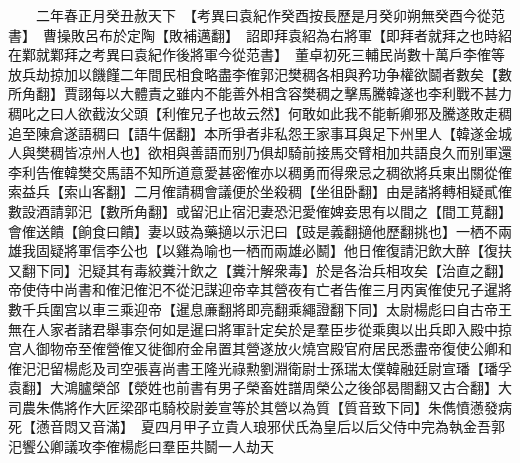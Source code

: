 　　二年春正月癸丑赦天下　【考異曰袁紀作癸酉按長歷是月癸卯朔無癸酉今從范書】　曹操敗呂布於定陶【敗補邁翻】　詔即拜袁紹為右將軍【即拜者就拜之也時紹在鄴就鄴拜之考異曰袁紀作後將軍今從范書】　董卓初死三輔民尚數十萬戶李傕等放兵劫掠加以饑饉二年間民相食略盡李傕郭汜樊稠各相與矜功争權欲鬬者數矣【數所角翻】賈詡每以大體責之雖内不能善外相含容樊稠之擊馬騰韓遂也李利戰不甚力稠叱之曰人欲截汝父頭【利傕兄子也故云然】何敢如此我不能斬卿邪及騰遂敗走稠追至陳倉遂語稠曰【語牛倨翻】本所爭者非私怨王家事耳與足下州里人【韓遂金城人與樊稠皆凉州人也】欲相與善語而别乃俱却騎前接馬交臂相加共語良久而别軍還李利告傕韓樊交馬語不知所道意愛甚密傕亦以稠勇而得衆忌之稠欲將兵東出關從傕索益兵【索山客翻】二月傕請稠會議便於坐殺稠【坐徂卧翻】由是諸將轉相疑貳傕數設酒請郭汜【數所角翻】或留汜止宿汜妻恐汜愛傕婢妾思有以間之【間工莧翻】會傕送饋【餉食曰饋】妻以豉為藥擿以示汜曰【豉是義翻擿他歷翻挑也】一栖不兩雄我固疑將軍信李公也【以雞為喻也一栖而兩雄必鬭】他日傕復請汜飲大醉【復扶又翻下同】汜疑其有毒絞糞汁飲之【糞汁解衆毒】於是各治兵相攻矣【治直之翻】帝使侍中尚書和傕汜傕汜不從汜謀迎帝幸其營夜有亡者告傕三月丙寅傕使兄子暹將數千兵圍宫以車三乘迎帝【暹息亷翻將即亮翻乘繩證翻下同】太尉楊彪曰自古帝王無在人家者諸君舉事奈何如是暹曰將軍計定矣於是羣臣步從乘輿以出兵即入殿中掠宫人御物帝至傕營傕又徙御府金帛置其營遂放火燒宫殿官府居民悉盡帝復使公卿和傕汜汜留楊彪及司空張喜尚書王隆光祿勲劉淵衛尉士孫瑞太僕韓融廷尉宣璠【璠孚袁翻】大鴻臚榮郃【滎姓也前書有男子榮畜姓譜周榮公之後郃曷閤翻又古合翻】大司農朱儁將作大匠梁邵屯騎校尉姜宣等於其營以為質【質音致下同】朱儁憤懣發病死【懣音悶又音滿】　夏四月甲子立貴人琅邪伏氏為皇后以后父侍中完為執金吾郭汜饗公卿議攻李傕楊彪曰羣臣共鬬一人劫天

